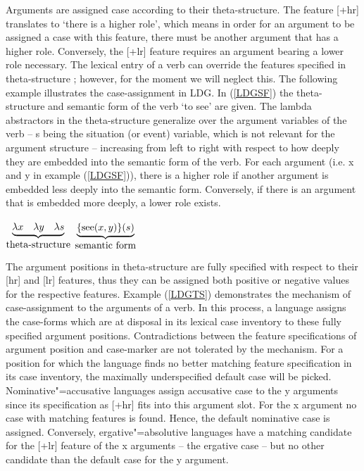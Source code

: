 Arguments are assigned case according to their theta-structure.
The feature [+hr] translates to `there is a higher role', which means in order for an argument to be assigned a case with this feature, there must be another argument that has a higher role. 
Conversely, the [+lr] feature requires an argument bearing a lower role necessary.
The lexical entry of a verb can override the features specified in theta-structure \citep{WunderlichLakaemper:2001}; however, for the moment we will neglect this. 
The following example illustrates the case-assignment in LDG.  In (\ref{LDGSF}) the theta-structure and semantic form of the verb `to see' are given.
The lambda abstractors in the theta-structure generalize over the argument variables of the verb -- {s} being the situation (or event) variable, which is not relevant for the argument structure -- increasing from left to right with respect to how deeply they are embedded into the semantic form of the verb.
For each argument (i.e. {x} and {y} in example (\ref{LDGSF})), there is a higher role if another argument is embedded less deeply into the semantic form. 
Conversely, if there is an argument that is embedded more deeply, a lower role exists.
 
\begin{exe}
\ex\label{LDGSF}
$ \underbrace{ \lambda x \quad \lambda y \quad \lambda s}_{\text{\normalsize theta-structure}}$
\qquad $ \underbrace{\{ \text{see} (x,y)\} (s)}_{\text{\normalsize semantic form}} $ 
\end{exe}

The argument positions in theta-structure are fully specified with respect to their [hr] and [lr] features, thus they can be assigned both positive or negative values for the respective features. 
Example (\ref{LDGTS}) demonstrates the mechanism of case-assignment to the arguments of a verb. 
In this process, a language assigns the case-forms  which are at disposal in its lexical case inventory to these fully specified argument positions. 
Contradictions between the feature specifications of argument position and case-marker are not tolerated by the mechanism. 
For a position for which the language finds no better matching feature specification in its case inventory, the maximally underspecified default case will be picked. 
Nominative"=accusative languages assign accusative case to the {y} arguments since its specification as [+hr] fits into this argument slot. 
For the {x} argument no case with matching features is found. 
Hence, the default nominative case is assigned. 
Conversely, ergative"=absolutive languages have a matching candidate for the [+lr] feature of the {x} arguments -- the ergative case -- but no other candidate than the default case for the {y} argument.  


